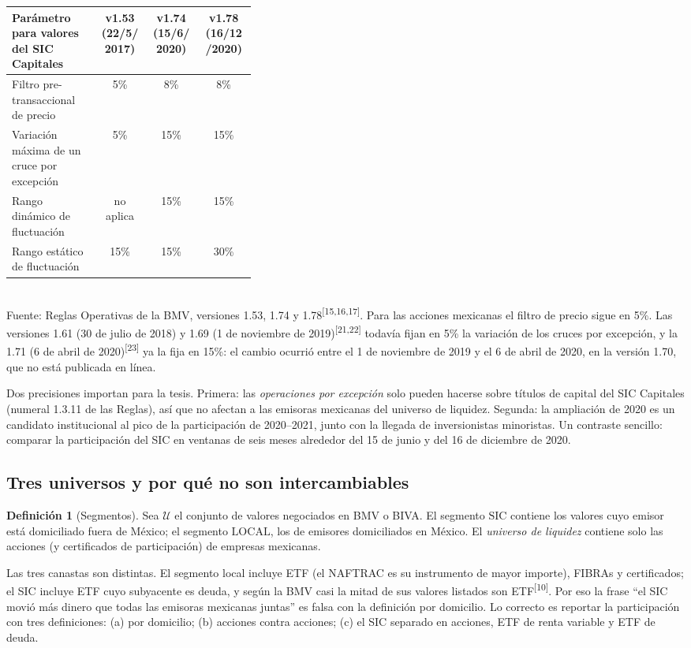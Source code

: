 \documentclass[11pt,letterpaper]{article}
\theoremstyle{definition}
\newtheorem{definicion}{Definición}[section]
\theoremstyle{plain}
\newcommand{\web}[1]{\textsuperscript{[#1]}}
\begin{document}
\begin{center}\small
\begin{tabular}{@{}p{0.36\linewidth}ccc@{}}\toprule
Parámetro para valores del SIC Capitales & v1.53 (22/5/2017) & v1.74 (15/6/2020) & v1.78 (16/12/2020)\\\midrule
Filtro pre-transaccional de precio & 5\% & 8\% & 8\%\\
Variación máxima de un cruce por excepción & 5\% & 15\% & 15\%\\
Rango dinámico de fluctuación & no aplica & 15\% & 15\%\\
Rango estático de fluctuación & 15\% & 15\% & 30\%\\\bottomrule
\end{tabular}\\[2pt]
{\footnotesize Fuente: Reglas Operativas de la BMV, versiones 1.53, 1.74 y 1.78\web{15,16,17}. Para las acciones mexicanas el filtro de precio sigue en 5\%. Las versiones 1.61 (30 de julio de 2018) y 1.69 (1 de noviembre de 2019)\web{21,22} todavía fijan en 5\% la variación de los cruces por excepción, y la 1.71 (6 de abril de 2020)\web{23} ya la fija en 15\%: el cambio ocurrió entre el 1 de noviembre de 2019 y el 6 de abril de 2020, en la versión 1.70, que no está publicada en línea.}
\end{center}

Dos precisiones importan para la tesis. Primera: las \emph{operaciones por excepción} solo pueden hacerse sobre títulos de capital del SIC Capitales (numeral 1.3.11 de las Reglas), así que no afectan a las emisoras mexicanas del universo de liquidez. Segunda: la ampliación de 2020 es un candidato institucional al pico de la participación de 2020--2021, junto con la llegada de inversionistas minoristas. Un contraste sencillo: comparar la participación del SIC en ventanas de seis meses alrededor del 15 de junio y del 16 de diciembre de 2020.

\subsection{Tres universos y por qué no son intercambiables}
\begin{definicion}[Segmentos]
Sea $\mathcal{U}$ el conjunto de valores negociados en BMV o BIVA. El segmento $\mathrm{SIC}$ contiene los valores cuyo emisor está domiciliado fuera de México; el segmento $\mathrm{LOCAL}$, los de emisores domiciliados en México. El \emph{universo de liquidez} contiene solo las acciones (y certificados de participación) de empresas mexicanas.
\end{definicion}
Las tres canastas son distintas. El segmento local incluye ETF (el NAFTRAC es su instrumento de mayor importe), FIBRAs y certificados; el SIC incluye ETF cuyo subyacente es deuda, y según la BMV casi la mitad de sus valores listados son ETF\web{10}. Por eso la frase ``el SIC movió más dinero que todas las emisoras mexicanas juntas'' es falsa con la definición por domicilio. Lo correcto es reportar la participación con tres definiciones: (a) por domicilio; (b) acciones contra acciones; (c) el SIC separado en acciones, ETF de renta variable y ETF de deuda.
\end{document}
